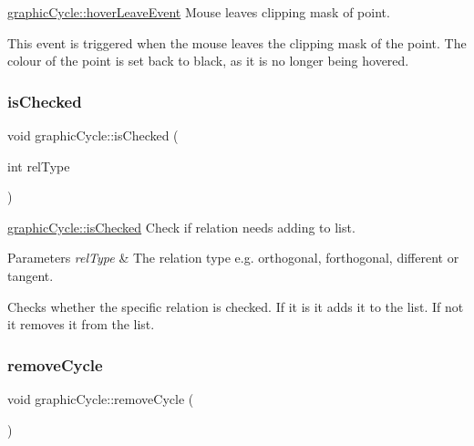 \mbox{\hyperlink{classgraphic_cycle_aa9aee0ce2a2448da8fd54766c086ec9a}{graphic\+Cycle\+::hover\+Leave\+Event}} Mouse leaves clipping mask of point. 

This event is triggered when the mouse leaves the clipping mask of the point. The colour of the point is set back to black, as it is no longer being hovered. \mbox{\label{classgraphic_cycle_afd9910a819e64c8e3efafe91717a0a20}} 
\subsubsection{\texorpdfstring{is\+Checked}{isChecked}}
{\footnotesize\ttfamily void graphic\+Cycle\+::is\+Checked (\begin{DoxyParamCaption}\item[{int}]{rel\+Type }\end{DoxyParamCaption})\hspace{0.3cm}{\ttfamily [slot]}}



\mbox{\hyperlink{classgraphic_cycle_afd9910a819e64c8e3efafe91717a0a20}{graphic\+Cycle\+::is\+Checked}} Check if relation needs adding to list. 


\begin{DoxyParams}{Parameters}
{\em rel\+Type} & The relation type e.\+g. orthogonal, forthogonal, different or tangent.\\
\hline
\end{DoxyParams}
Checks whether the specific relation is checked. If it is it adds it to the list. If not it removes it from the list. \mbox{\label{classgraphic_cycle_aba3c23f4bce3028b9f4582dc2e145e1e}} 
\subsubsection{\texorpdfstring{remove\+Cycle}{removeCycle}}
{\footnotesize\ttfamily void graphic\+Cycle\+::remove\+Cycle (\begin{DoxyParamCaption}{ }\end{DoxyParamCaption})\hspace{0.3cm}{\ttfamily [slot]}}



